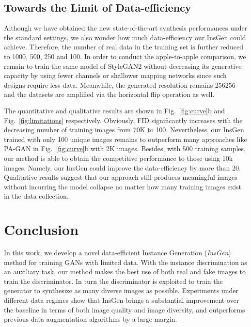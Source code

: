 \documentclass{article}
\begin{document}
\subsection{Towards the Limit of Data-efficiency}\label{subsec:limitation}


Although we have obtained the new state-of-the-art synthesis performances under the standard settings, we also wonder how much data-efficiency our InsGen could achieve. Therefore, the number of real data in the training set is further reduced to 1000, 500, 250 and 100. In order to conduct the apple-to-apple comparison, we remain to train the same model of StyleGAN2 without decreasing its generative capacity by using fewer channels or shallower mapping networks since such designs require less data. Meanwhile, the generated resolution remains 256256 and the datasets are amplified via the horizontal flip operation as well.


The quantitative and qualitative results are shown in Fig.~\ref{fig:curve}b and Fig.~\ref{fig:limitations} respectively.
Obviously, FID significantly increases with the decreasing number of training images from 70K to 100. Nevertheless, our InsGen trained with only 100 unique images remains to outperform many approaches like PA-GAN in Fig.~\ref{fig:curve}b with 2K images.
Besides, with 500 training samples, our method is able to obtain the competitive performance to those using 10k images. Namely, our InsGen could improve the data-efficiency by more than 20. Qualitative results suggest that our approach still produces meaningful images without incurring the model collapse no matter how many training images exist in the data collection.


\section{Conclusion}\label{sec:conclusion}


In this work, we develop a novel data-efficient Instance Generation (\textit{InsGen}) method for training GANs with limited data.
With the instance discrimination as an auxiliary task, our method makes the best use of both real and fake images to train the discriminator.
In turn the discriminator is exploited to train the generator to synthesize as many diverse images as possible.
Experiments under different data regimes show that InsGen brings a substantial improvement over the baseline in terms of both image quality and image diversity, and outperforms previous data augmentation algorithms by a large margin.


{\small


}
\end{document}
